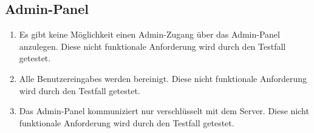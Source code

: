 \subsection*{Admin-Panel}

\begin{samepage}
    \begin{enumerate}[label=\textbf{/NFS\arabic*0/}, align=left, start=4]
        \item \label{/NFS40/} Es gibt keine Möglichkeit einen \Gls{Admin-Zugang} über das \Gls{Admin-Panel} anzulegen. Diese nicht funktionale Anforderung wird durch den Testfall  getestet.
        \item \label{/NFS50/} Alle \Glspl{Benutzereingabe} werden bereinigt. Diese nicht funktionale Anforderung wird durch den Testfall  getestet.
        \item \label{/NFS60/} Das \Gls{Admin-Panel} kommuniziert nur verschlüsselt mit dem \Gls{Server}. Diese nicht funktionale Anforderung wird durch den Testfall  getestet.
    \end{enumerate}
\end{samepage}
